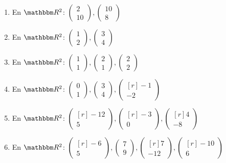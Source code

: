 \begin{enumerate}[resume]
    \item En $ \RR[2]$: $\begin{pmatrix} 2 \\ 10 \end{pmatrix}, \begin{pmatrix} 10 \\ 8 \end{pmatrix}$
    \item En $ \RR[2]$: $\begin{pmatrix} 1 \\ 2 \end{pmatrix}, \begin{pmatrix} 3 \\ 4 \end{pmatrix}$
    \item En $ \RR[2]$: $\begin{pmatrix} 1 \\ 1 \end{pmatrix}, \begin{pmatrix} 2 \\ 1 \end{pmatrix}, \begin{pmatrix} 2 \\ 2 \end{pmatrix}$
    \item En $\RR[2]$: $\begin{pmatrix} 0 \\ 1 \end{pmatrix}, \begin{pmatrix} 3 \\ 4 \end{pmatrix}, \begin{pmatrix*}[r] -1 \\ -2 \end{pmatrix*}$
    \item En $ \RR[2]$: $\begin{pmatrix*}[r] -12 \\ 5 \end{pmatrix*}, \begin{pmatrix*}[r] -3 \\ 0 \end{pmatrix*}, \begin{pmatrix*}[r] 4 \\ -8 \end{pmatrix*}$\newpage
    \item En $\RR[2]$: $\begin{pmatrix*}[r] -6 \\ 5 \end{pmatrix*}, \begin{pmatrix} 7 \\ 9 \end{pmatrix}, \begin{pmatrix*}[r] 7 \\ -12 \end{pmatrix*}, \begin{pmatrix*}[r] -10 \\ 6 \end{pmatrix*}$

\end{enumerate}

